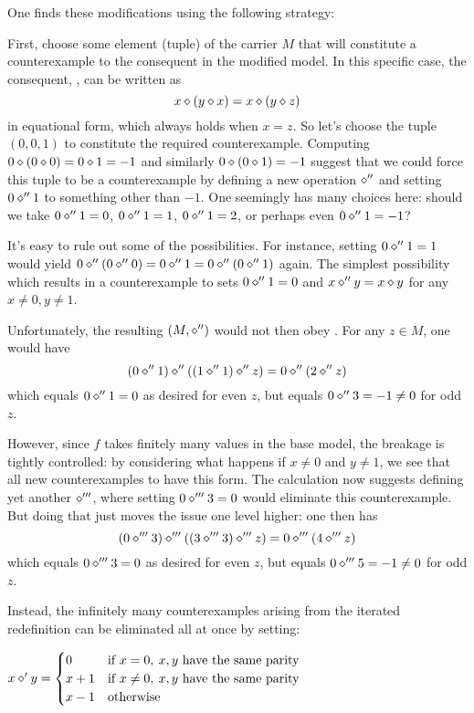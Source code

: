 One finds these modifications using the following strategy:

First, choose some element (tuple) of the carrier $M$ that will constitute a counterexample to the
consequent in the modified model. In this specific case, the consequent, , can be written as
$$ x \diamond (y \diamond x) = x \diamond (y \diamond z)$$
in equational form, which always holds when $x = z$. So let's choose the tuple $(0,0,1)$
to constitute the required counterexample. Computing $0 \diamond (0 \diamond 0) = 0 \diamond 1 = -1$ and similarly
$0 \diamond (0 \diamond 1) = -1$ suggest that we could force this tuple to be a counterexample by defining a new
operation $\diamond''$ and setting
$0 \diamond'' 1$ to something other than $-1$. One seemingly has many choices here: should we take
$0 \diamond'' 1 =0$, $0 \diamond'' 1 = 1$, $0 \diamond'' 1 = 2$, or perhaps even $0 \diamond'' 1 = -1$?

It's easy to rule out some of the possibilities. For instance, setting $0 \diamond'' 1 = 1$ would
yield $0 \diamond'' (0 \diamond'' 0) = 0 \diamond'' 1 = 0 \diamond'' (0 \diamond'' 1)$ again. The simplest possibility which results in
a counterexample to  sets $0 \diamond'' 1 = 0$ and $x \diamond'' y = x \diamond y$ for any $x \neq 0, y \neq 1$.

Unfortunately, the resulting $(M,\diamond'')$ would not then obey . For any $z \in M$, one would have
$$ (0 \diamond'' 1) \diamond'' ((1 \diamond'' 1) \diamond'' z) = 0 \diamond'' (2 \diamond'' z)$$
which equals $0 \diamond'' 1 = 0$ as desired for even $z$, but equals $0 \diamond'' 3 = -1 \neq 0$ for odd $z$.

However, since $f$ takes finitely many values in the base model, the breakage is tightly controlled:
by considering what happens if $x \neq 0$ and $y \neq 1$, we see that all new counterexamples to 
have this form. The calculation now suggests defining yet another $\diamond'''$, where setting
$0 \diamond''' 3 = 0$ would eliminate
this counterexample. But doing that just moves the issue one level higher: one then has
$$ (0 \diamond''' 3) \diamond''' ((3 \diamond''' 3) \diamond''' z) = 0 \diamond''' (4 \diamond''' z)$$ which equals $0 \diamond''' 3 = 0$ as desired for even $z$, but equals $0 \diamond''' 5 = -1 \neq 0$ for odd $z$.

Instead, the infinitely many counterexamples arising from the iterated redefinition can be eliminated
all at once by setting:

$x \diamond' y = \begin{cases} 0 & \text{if } x=0,\: x,y \text{ have the same parity} \\  x+1 & \text{if } x\neq 0,\: x,y \text{ have the same parity} \\ x -1 & \text{otherwise} \end{cases}$

